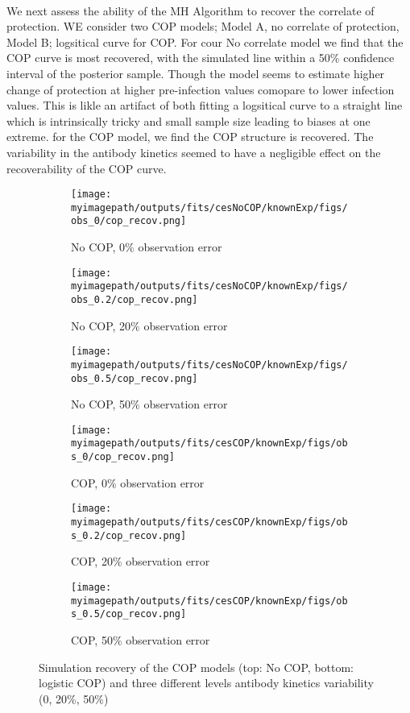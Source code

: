 \documentclass{article}
\newcommand{\myimagepath}{/Users/davidhodgson/Dropbox/Mac (3)/Documents/research/Rpackages/rjmc/}
\begin{document}
\paragraph{}We next assess the ability of the MH Algorithm to recover the correlate of protection. WE consider two COP models; Model A, no correlate of protection, Model B; logsitical curve for COP. For cour No correlate model we find that the COP curve is most recovered, with the simulated line within a 50\% confidence interval of the posterior sample. Though the model seems to estimate higher change of protection at higher pre-infection values comopare to lower infection values. This is likle an artifact of both fitting a logsitical curve to a straight line which is intrinsically tricky and small sample size leading to biases at one extreme. for the COP model, we find the COP structure is recovered. The variability in the antibody kinetics seemed to have a negligible effect on the recoverability of the COP curve. 

\begin{figure}[H]
    \centering
    \begin{subfigure}{0.31\textwidth}
        \centering
        \texttt{[image: \\myimagepath/outputs/fits/cesNoCOP/knownExp/figs/obs\_0/cop\_recov.png]}
        \caption{No COP, 0\% observation error}
    \end{subfigure}
    \begin{subfigure}{0.31\textwidth}
        \centering
        \texttt{[image: \\myimagepath/outputs/fits/cesNoCOP/knownExp/figs/obs\_0.2/cop\_recov.png]}
        \caption{No COP, 20\% observation error}
    \end{subfigure}
    \begin{subfigure}{0.31\textwidth}
        \centering
        \texttt{[image: \\myimagepath/outputs/fits/cesNoCOP/knownExp/figs/obs\_0.5/cop\_recov.png]}
        \caption{No COP, 50\% observation error}
    \end{subfigure}
    
  \begin{subfigure}{0.31\textwidth}
        \centering
        \texttt{[image: \\myimagepath/outputs/fits/cesCOP/knownExp/figs/obs\_0/cop\_recov.png]}
        \caption{ COP, 0\% observation error}
    \end{subfigure}
    \begin{subfigure}{0.31\textwidth}
        \centering
        \texttt{[image: \\myimagepath/outputs/fits/cesCOP/knownExp/figs/obs\_0.2/cop\_recov.png]}
        \caption{ COP, 20\% observation error}
    \end{subfigure}
    \begin{subfigure}{0.31\textwidth}
        \centering
        \texttt{[image: \\myimagepath/outputs/fits/cesCOP/knownExp/figs/obs\_0.5/cop\_recov.png]}
        \caption{ COP, 50\% observation error}
    \end{subfigure}
    
    \caption{Simulation recovery of the COP models (top: No COP, bottom: logistic COP) and three different levels antibody kinetics variability (0, 20\%, 50\%)}
\end{figure}
\end{document}
